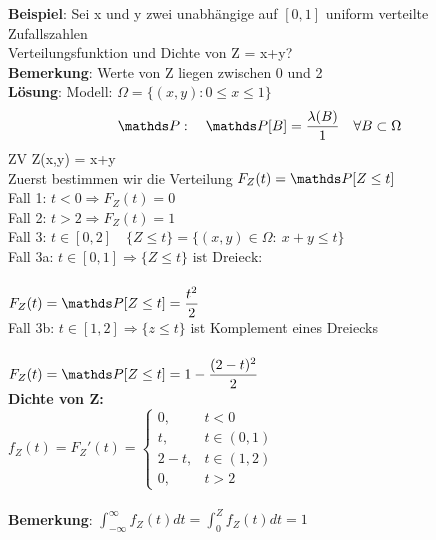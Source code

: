 \textbf{Beispiel}: Sei x und y zwei unabhängige auf $[0,1]$ uniform verteilte Zufallszahlen\\
Verteilungsfunktion und Dichte von Z = x+y?\medskip\\
\textbf{Bemerkung}: Werte von Z liegen zwischen 0 und 2\medskip\\
\textbf{Lösung}: Modell: $\Omega = \{(x,y): 0 \leq x \leq 1\}$ \\
$$\PP:\quad \PP[B] = \dfrac{\lambda(B)}{1}\quad \forall B \subset \Omega$$
ZV Z(x,y) = x+y\smallskip\\
Zuerst bestimmen wir die Verteilung $F_Z(t) = \PP[Z \leq t]$\medskip\\
Fall 1: $t<0 \Rightarrow F_Z(t)=0$\smallskip\\
Fall 2: $t>2 \Rightarrow F_Z(t) = 1$\smallskip\\
Fall 3: $t \in [0,2] \quad \{Z \leq t\} = \{(x,y) \in \Omega: \: x+y \leq t \}$\smallskip\\
Fall 3a: $t \in [0,1] \Rightarrow \{Z \leq t\} \text{ ist Dreieck}:$\\
\\
$F_Z(t) = \PP[Z \leq t] = \dfrac{t^2}{2}$\smallskip\\
Fall 3b: $t \in [1,2] \Rightarrow \{z \leq t\}$ ist Komplement eines Dreiecks\\
 \smallskip\\
 $F_Z(t) = \PP [Z \leq t] = 1-\dfrac{(2-t)^2}{2}$
 \medskip\\
\textbf{ Dichte von Z:}\\
 $f_Z(t)=F_Z'(t) = \begin{cases}
 0, & t<0\\
 t, &t \in (0,1)\\
 2-t,&t \in (1,2)\\
 0,&t>2
 \end{cases}$\smallskip\\\medskip\\
 \textbf{Bemerkung}: $\displaystyle \int_{-\infty}^{\infty} f_Z(t) dt = \displaystyle \int_{0}^{Z}f_Z(t)dt = 1$